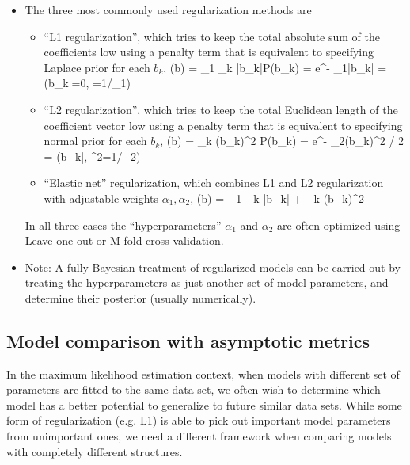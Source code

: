 \begin{itemize}
	\item The three most commonly used regularization methods are 
	\begin{itemize}
		\item ``L1 regularization'', which tries to keep the total absolute sum of the coefficients low using a penalty term that is equivalent to specifying Laplace prior for each $b_k$,
		\be
			(b) = \alpha_1 \sum_k |b_k|\qquad \Leftrightarrow \qquad P(b_k) =  \times e^{- \alpha_1|b_k|} = (b_k\;|\;=0, =1/\alpha_1)
		\ee

		\item ``L2 regularization'', which tries to keep the total Euclidean length of the coefficient vector low using a penalty term that is equivalent to specifying normal prior for each $b_k$,
		\be
			(b) = \sum_k (b_k)^2
			\qquad \Leftrightarrow \qquad
			P(b_k) =  \times e^{- \alpha_2(b_k)^2 / 2} = (b_k\;|\;, \sigma^2=1/\alpha_2)
		\ee
		\item ``Elastic net'' regularization, which combines L1 and L2 regularization with adjustable weights $\alpha_1, \alpha_2$, 
		\be
			(b) = \alpha_1 \sum_k |b_k| + \sum_k (b_k)^2
		\ee
	\end{itemize}
	In all three cases the ``hyperparameters'' $\alpha_1$ and $\alpha_2$ are often optimized using Leave-one-out or M-fold cross-validation. 

	\item Note: A fully Bayesian treatment of regularized models can be carried out by treating the hyperparameters as just another set of model parameters, and determine their posterior (usually numerically).
\end{itemize}

\subsection{Model comparison with asymptotic metrics}

In the maximum likelihood estimation context, when models with different set of parameters are fitted to the same data set, we often wish to determine which model has a better potential to generalize to future similar data sets. While some form of regularization (e.g. L1) is able to pick out important model parameters from unimportant ones, we need a different framework when comparing models with completely different structures. 

